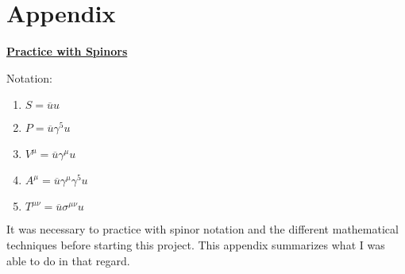 \documentclass[12pt]{article}
\def \ou{\overline{u}}
\def \ga{\gamma}
\def \si{\sigma}
\begin{document}
\section{Appendix}
\begin{center}
\underline{\textbf{\Large Practice with Spinors}}
\end{center}
Notation:
\begin{enumerate} \itemsep=-15pt
\item $S= \ou u$\\
\item $P=\ou \ga^5 u$ \\
\item $V^\mu = \ou \ga^\mu u$ \\
\item $A^\mu = \ou \ga^\mu \ga^5 u $ \\
\item $T^{\mu\nu} = \ou \si^{\mu\nu} u$
\end{enumerate}
\bigskip
It was necessary to practice with spinor notation and the different mathematical techniques before starting this project. This appendix summarizes what I was able to do in that regard. 
\end{document}
